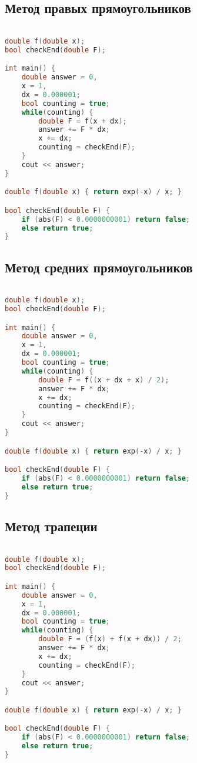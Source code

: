 \documentclass[14pt, titlepage, fleqn]{extarticle}
\begin{document}
	\newpage
	\subsection*{Метод правых прямоугольников}
	\begin{lstlisting}[language=C++, basicstyle=\footnotesize\ttfamily, frame = single]

double f(double x);
bool checkEnd(double F);

int main() {
	double answer = 0, 
	x = 1, 
	dx = 0.000001;
	bool counting = true;
	while(counting) {		
		double F = f(x + dx);
		answer += F * dx;
		x += dx;
		counting = checkEnd(F);		
	}
	cout << answer;
}

double f(double x) { return exp(-x) / x; }

bool checkEnd(double F) {
	if (abs(F) < 0.0000000001) return false;
	else return true;
}

	\end{lstlisting}

	\newpage
	\subsection*{Метод средних прямоугольников}
	\begin{lstlisting}[language=C++, basicstyle=\footnotesize\ttfamily, frame = single]

double f(double x);
bool checkEnd(double F);

int main() {
	double answer = 0, 
	x = 1, 
	dx = 0.000001;
	bool counting = true;
	while(counting) {		
		double F = f((x + dx + x) / 2);
		answer += F * dx;
		x += dx;
		counting = checkEnd(F);		
	}
	cout << answer;
}

double f(double x) { return exp(-x) / x; }

bool checkEnd(double F) {
	if (abs(F) < 0.0000000001) return false;
	else return true;
}

	\end{lstlisting}

	\newpage
	\subsection*{Метод трапеции}
	\begin{lstlisting}[language=C++, basicstyle=\footnotesize\ttfamily, frame = single]

double f(double x);
bool checkEnd(double F);

int main() {
	double answer = 0, 
	x = 1, 
	dx = 0.000001;
	bool counting = true;
	while(counting) {		
		double F = (f(x) + f(x + dx)) / 2;
		answer += F * dx;
		x += dx;
		counting = checkEnd(F);		
	}
	cout << answer;
}

double f(double x) { return exp(-x) / x; }

bool checkEnd(double F) {
	if (abs(F) < 0.0000000001) return false;
	else return true;
}

	\end{lstlisting}
\newpage
\end{document}
